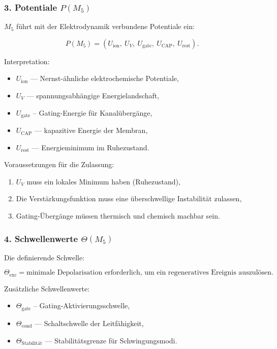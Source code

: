 \subsubsection*{3. Potentiale \texorpdfstring{$P(M_5)$}{P(M_5)}}

$M_5$ führt mit der Elektrodynamik verbundene Potentiale ein:

\[
P(M_5) =
(U_{\mathrm{ion}},\ U_V,\ U_{\mathrm{gate}},\
U_{\mathrm{CAP}},\ U_{\mathrm{rest}}).
\]

Interpretation:

\begin{itemize}
    \item $U_{\mathrm{ion}}$ — Nernst-ähnliche elektrochemische Potentiale,
    \item $U_V$ — spannungsabhängige Energielandschaft,
    \item $U_{\mathrm{gate}}$ – Gating-Energie für Kanalübergänge,
    \item $U_{\mathrm{CAP}}$ — kapazitive Energie der Membran,
    \item $U_{\mathrm{rest}}$ — Energieminimum im Ruhezustand.
\end{itemize}

Voraussetzungen für die Zulassung:

\begin{enumerate}
    \item $U_V$ muss ein lokales Minimum haben (Ruhezustand),
    \item Die Verstärkungsfunktion muss eine überschwellige Instabilität zulassen,
    \item Gating-Übergänge müssen thermisch und chemisch machbar sein.
\end{enumerate}

\subsubsection*{4. Schwellenwerte \texorpdfstring{$\Theta(M_5)$}{\Theta(M_5)}}

Die definierende Schwelle:

\[
\Theta_{\mathrm{exc}} = \text{minimale Depolarisation erforderlich, um ein regeneratives Ereignis auszulösen}.
\]

Zusätzliche Schwellenwerte:

\begin{itemize}
    \item $\Theta_{\mathrm{gate}}$ – Gating-Aktivierungsschwelle,
    \item $\Theta_{\mathrm{cond}}$ — Schaltschwelle der Leitfähigkeit,
    \item $\Theta_{\mathrm{Stabilität}}$ — Stabilitätsgrenze für Schwingungsmodi.
\end{itemize}

